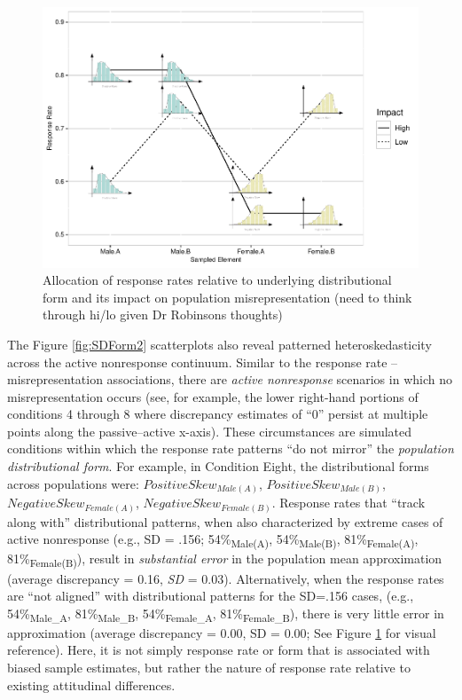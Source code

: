 \documentclass[
  man,mask]{apa7}
\begin{document}
\begin{figure}
\centering
\includegraphics{paper_files/figure-latex/CattelExplain-1.pdf}
\caption{\label{fig:CattelExplain}Allocation of response rates relative to underlying distributional form and its impact on population misrepresentation (need to think through hi/lo given Dr Robinsons thoughts)}
\end{figure}

The Figure \ref{fig:SDForm2} scatterplots also reveal patterned heteroskedasticity across the active nonresponse continuum. Similar to the response rate -- misrepresentation associations, there are \emph{active nonresponse} scenarios in which no misrepresentation occurs (see, for example, the lower right-hand portions of conditions 4 through 8 where discrepancy estimates of ``0'' persist at multiple points along the passive--active x-axis). These circumstances are simulated conditions within which the response rate patterns ``do not mirror'' the \emph{population distributional form}. For example, in Condition Eight, the distributional forms across populations were: \(Positive Skew_{Male(A)}\), \(Positive Skew_{Male(B)}\), \(Negative Skew_{Female(A)}\), \(Negative Skew_{Female(B)}\). Response rates that ``track along with'' distributional patterns, when also characterized by extreme cases of active nonresponse (e.g., SD = .156; 54\%\textsubscript{Male(A)}, 54\%\textsubscript{Male(B)}, 81\%\textsubscript{Female(A)}, 81\%\textsubscript{Female(B)}), result in \emph{substantial error} in the population mean approximation (average discrepancy = 0.16, \emph{SD} = 0.03). Alternatively, when the response rates are ``not aligned'' with distributional patterns for the SD=.156 cases, (e.g., 54\%\textsubscript{Male\_A}, 81\%\textsubscript{Male\_B}, 54\%\textsubscript{Female\_A}, 81\%\textsubscript{Female\_B}), there is very little error in approximation (average discrepancy = 0.00, SD = 0.00; See Figure \ref{fig:CattelExplain} for visual reference). Here, it is not simply response rate or form that is associated with biased sample estimates, but rather the nature of response rate relative to existing attitudinal differences.
\end{document}
